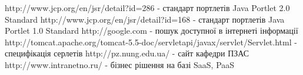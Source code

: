 \renewcommand{\refname}{ВИКОРИСТАНІ ДЖЕРЕЛА}
\begin{thebibliography}{99}
 http://www.jcp.org/en/jsr/detail?id=286 - стандарт портлетів Java Portlet 2.0 Standard 
 http://www.jcp.org/en/jsr/detail?id=168 - стандарт портлетів Java Portlet 1.0 Standard 
 http://google.com - пошук доступної в інтернеті інформації
 http://tomcat.apache.org/tomcat-5.5-doc/servletapi/javax/servlet/Servlet.html - специфікація серлетів
 http://pz.nung.edu.ua/ - сайт кафедри ПЗАС
 http://www.intranetno.ru/ - бізнес рішення на базі SaaS, PaaS
\end{thebibliography}




